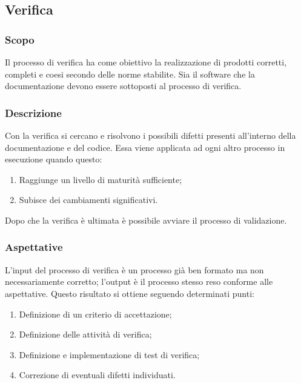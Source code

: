 \subsection{Verifica} \label{_verifica}
\subsubsection{Scopo}
Il processo di verifica ha come obiettivo la realizzazione di prodotti corretti, completi e coesi secondo delle norme stabilite. Sia il software che la documentazione devono essere sottoposti al processo di verifica.

\subsubsection{Descrizione}
Con la verifica si cercano e  risolvono i possibili difetti presenti all'interno della documentazione e del codice. Essa viene applicata ad ogni altro processo in esecuzione quando questo:
\begin{enumerate}
    \item Raggiunge un livello di maturità sufficiente;
    \item Subisce dei cambiamenti significativi.
\end{enumerate}
Dopo che la verifica è ultimata è possibile avviare il processo di validazione.

\subsubsection{Aspettative}
L'input del processo di verifica è un processo già ben formato ma non necessariamente corretto; l'output è il processo stesso reso conforme alle aspettative. Questo risultato si ottiene seguendo determinati punti:
\begin{enumerate}
    \item Definizione di un criterio di accettazione;
    \item Definizione delle attività di verifica;
    \item Definizione e implementazione di test di verifica;
    \item Correzione di eventuali difetti individuati.
\end{enumerate}

